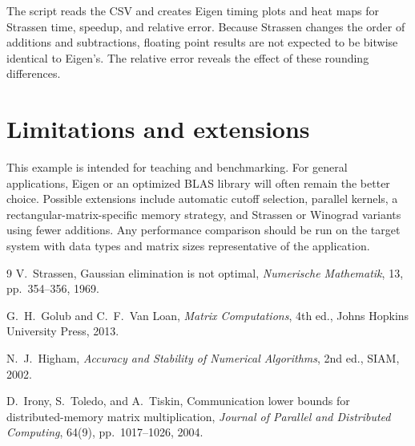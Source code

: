 \documentclass[11pt,a4paper]{article}
\newcommand{\code}[1]{\texttt{\detokenize{#1}}}
\begin{document}
The script \code{plot_strassen_benchmark.py} reads the CSV and creates Eigen
timing plots and heat maps for Strassen time, speedup, and relative error.
Because Strassen changes the order of additions and subtractions, floating
point results are not expected to be bitwise identical to Eigen's. The relative
error reveals the effect of these rounding differences.

\section{Limitations and extensions}

This example is intended for teaching and benchmarking. For general
applications, Eigen or an optimized BLAS library will often remain the better
choice. Possible extensions include automatic cutoff selection, parallel
kernels, a rectangular-matrix-specific memory strategy, and Strassen or
Winograd variants using fewer additions. Any performance comparison should be
run on the target system with data types and matrix sizes representative of the
application.

\begin{thebibliography}{9}
V.~Strassen, Gaussian elimination is not optimal,
\emph{Numerische Mathematik}, 13, pp.~354--356, 1969.

G.~H.~Golub and C.~F.~Van Loan,
\emph{Matrix Computations}, 4th ed., Johns Hopkins University Press, 2013.

N.~J.~Higham, \emph{Accuracy and Stability of Numerical Algorithms},
2nd ed., SIAM, 2002.

D.~Irony, S.~Toledo, and A.~Tiskin,
Communication lower bounds for distributed-memory matrix multiplication,
\emph{Journal of Parallel and Distributed Computing}, 64(9), pp.~1017--1026,
2004.
\end{thebibliography}
\end{document}

